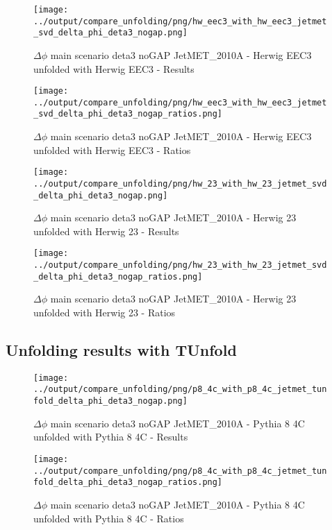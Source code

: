 \documentclass[11pt]{book}
\begin{document}
\begin{figure}[ht]
\centering
\texttt{[image: ../output/compare\_unfolding/png/hw\_eec3\_with\_hw\_eec3\_jetmet\_svd\_delta\_phi\_deta3\_nogap.png]}
\caption{$\Delta\phi$ main scenario deta3 noGAP JetMET\_2010A - Herwig EEC3 unfolded with Herwig EEC3 - Results}
\label{hw_eec3_hw_eec3_jetmet_svd_delta_phi_deta3_nogap_a}
\end{figure}

\begin{figure}[ht]
\centering
\texttt{[image: ../output/compare\_unfolding/png/hw\_eec3\_with\_hw\_eec3\_jetmet\_svd\_delta\_phi\_deta3\_nogap\_ratios.png]}
\caption{$\Delta\phi$ main scenario deta3 noGAP JetMET\_2010A - Herwig EEC3 unfolded with Herwig EEC3 - Ratios}
\label{hw_eec3_hw_eec3_jetmet_svd_delta_phi_deta3_nogap_b}
\end{figure}

\begin{figure}[ht]
\centering
\texttt{[image: ../output/compare\_unfolding/png/hw\_23\_with\_hw\_23\_jetmet\_svd\_delta\_phi\_deta3\_nogap.png]}
\caption{$\Delta\phi$ main scenario deta3 noGAP JetMET\_2010A - Herwig 23 unfolded with Herwig 23 - Results}
\label{hw_23_hw_23_jetmet_svd_delta_phi_deta3_nogap_a}
\end{figure}

\begin{figure}[ht]
\centering
\texttt{[image: ../output/compare\_unfolding/png/hw\_23\_with\_hw\_23\_jetmet\_svd\_delta\_phi\_deta3\_nogap\_ratios.png]}
\caption{$\Delta\phi$ main scenario deta3 noGAP JetMET\_2010A - Herwig 23 unfolded with Herwig 23 - Ratios}
\label{hw_23_hw_23_jetmet_svd_delta_phi_deta3_nogap_b}
\end{figure}


\clearpage
\subsection{Unfolding results with TUnfold}

\begin{figure}[ht]
\centering
\texttt{[image: ../output/compare\_unfolding/png/p8\_4c\_with\_p8\_4c\_jetmet\_tunfold\_delta\_phi\_deta3\_nogap.png]}
\caption{$\Delta\phi$ main scenario deta3 noGAP JetMET\_2010A - Pythia 8 4C unfolded with Pythia 8 4C - Results}
\label{p8_p8_jetmet_tunfold_delta_phi_deta3_nogap_a}
\end{figure}

\begin{figure}[ht]
\centering
\texttt{[image: ../output/compare\_unfolding/png/p8\_4c\_with\_p8\_4c\_jetmet\_tunfold\_delta\_phi\_deta3\_nogap\_ratios.png]}
\caption{$\Delta\phi$ main scenario deta3 noGAP JetMET\_2010A - Pythia 8 4C unfolded with Pythia 8 4C - Ratios}
\label{p8_p8_jetmet_tunfold_delta_phi_deta3_nogap_b}
\end{figure}
\end{document}
